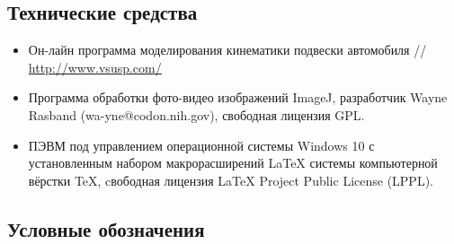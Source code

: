 \subsection{Технические средства}  %
\begin{itemize}
%
\item Он-лайн программа моделирования кинематики подвески автомобиля // \url{http://www.vsusp.com/}
\item  Программа обработки фото-видео изображений ImageJ, разработчик  Wayne Rasband (wa-yne@codon.nih.gov),
свободная лицензия GPL.
\item  ПЭВМ под управлением операционной системы Windows 10 с установленным набором макрорасширений LaTeX системы компьютерной вёрстки TeX, cвободная лицензия LaTeX Project Public License (LPPL). 
%	
\end{itemize}
\subsection{Условные обозначения}

